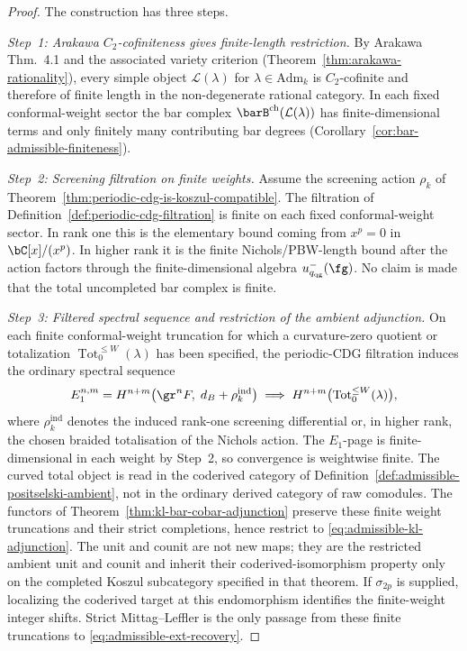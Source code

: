 \begin{proof}
The construction has three steps.

\emph{Step~1: Arakawa $C_2$-cofiniteness gives finite-length
restriction.}
By Arakawa~\cite{Arakawa15} Thm.~4.1 and the associated
variety criterion \textup{(}Theorem~\ref{thm:arakawa-rationality}\textup{)},
every simple object $\mathcal{L}(\lambda)$ for
$\lambda \in \mathrm{Adm}_k$ is $C_2$-cofinite and therefore of
finite length in the non-degenerate rational category.  In each fixed
conformal-weight sector the bar complex
$\barB^{\mathrm{ch}}(\mathcal{L}(\lambda))$ has finite-dimensional
terms and only finitely many contributing bar degrees
\textup{(}Corollary~\ref{cor:bar-admissible-finiteness}\textup{)}.

\emph{Step~2: Screening filtration on finite weights.}
Assume the screening action $\rho_k$ of
Theorem~\ref{thm:periodic-cdg-is-koszul-compatible}.  The filtration
of Definition~\ref{def:periodic-cdg-filtration} is finite on each
fixed conformal-weight sector.  In rank one this is the elementary
bound coming from $x^p=0$ in $\bC[x]/(x^p)$.  In higher rank it is
the finite Nichols/PBW-length bound after the action factors through
the finite-dimensional algebra $u_{q_{\mathrm{qg}}}^-(\fg)$.  No
claim is made that the total uncompleted bar complex is finite.

\emph{Step~3: Filtered spectral sequence and restriction of the
ambient adjunction.}
On each finite conformal-weight truncation for which a curvature-zero
quotient or totalization
$\operatorname{Tot}^{\leq W}_0(\lambda)$ has been specified, the
periodic-CDG filtration induces the ordinary spectral sequence
\begin{equation}\label{eq:admissible-kl-ss}
E_1^{n,m}
= H^{n+m}\bigl(\gr^n F, \;
d_B + \rho_k^{\mathrm{ind}}\bigr)
\;\Longrightarrow\;
H^{n+m}\bigl(\operatorname{Tot}^{\leq W}_0(\lambda)\bigr),
\end{equation}
where $\rho_k^{\mathrm{ind}}$ denotes the induced rank-one screening
differential or, in higher rank, the chosen braided totalisation of
the Nichols action.  The $E_1$-page is finite-dimensional in each
weight by Step~2, so convergence is weightwise finite.  The curved
total object is read in the coderived category of
Definition~\ref{def:admissible-positselski-ambient}, not in the
ordinary derived category of raw comodules.  The functors of
Theorem~\ref{thm:kl-bar-cobar-adjunction} preserve these finite
weight truncations and their strict completions, hence restrict to
\eqref{eq:admissible-kl-adjunction}.  The unit and counit are not new
maps; they are the restricted ambient unit and counit and inherit
their coderived-isomorphism property only on the completed Koszul
subcategory specified in that theorem.  If $\sigma_{2p}$ is supplied,
localizing the coderived target at this endomorphism identifies the
finite-weight integer shifts.  Strict Mittag--Leffler is the only
passage from these finite truncations to
\eqref{eq:admissible-ext-recovery}.
\end{proof}

